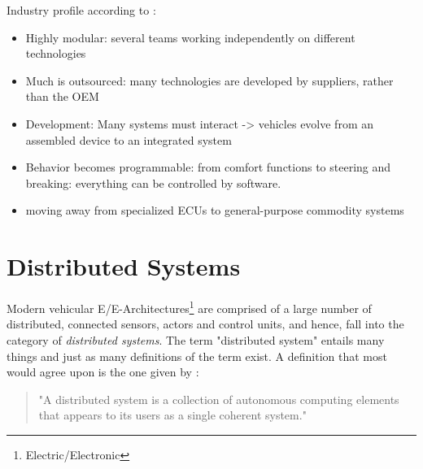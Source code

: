Industry profile according to \citeauthor*{broy2006challenges}:
\begin{itemize}
\item Highly modular: several teams working independently on different technologies
\item Much is outsourced: many technologies are developed by suppliers, rather than the OEM 
\item Development: Many systems must interact -> vehicles evolve from an assembled device to an integrated system
\item Behavior becomes programmable: from comfort functions to steering and breaking: everything can be controlled by software.
\item moving away from specialized ECUs to general-purpose commodity systems
\end{itemize}

%
%
%
%
%
%
%
%
%
%

\section{Distributed Systems}
Modern vehicular E/E-Architectures\footnote{Electric/Electronic} are comprised of a large number of distributed, connected sensors, actors and control units, and hence, fall into the category of \emph{distributed systems}. The term "distributed system" entails many things and just as many definitions of the term exist. A definition that most would agree upon is the one given by \citeauthor*{tanenbaum2017distributed} \cite{tanenbaum2017distributed}: 
\begin{quote}
"A distributed system is a collection of autonomous computing elements that appears to its users as a single coherent system."
\end{quote}

